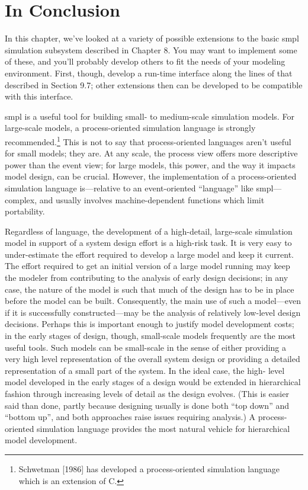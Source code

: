 \section{In Conclusion}

In this chapter, we've looked at a variety of possible extensions to the
basic smpl simulation subsystem described in Chapter 8. You may want to
implement some of these, and you'll probably develop others to fit the needs
of your modeling environment. First, though, develop a run-time interface
along the lines of that described in Section 9.7; other extensions then can be
developed to be compatible with this interface.

smpl is a useful tool for building small- to medium-scale simulation
models. For large-scale models, a process-oriented simulation language is
strongly recommended.\footnote{Schwetman [1986] has developed a process-oriented simulation language which is an extension of C.}
This is not to say that process-oriented languages
aren't useful for small models; they are. At any scale, the process view
offers more descriptive power than the event view; for large models, this
power, and the way it impacts model design, can be crucial. However, the
implementation of a process-oriented simulation language is---relative to an
event-oriented ``language'' like smpl---complex, and usually involves
machine-dependent functions which limit portability.

Regardless of language, the development of a high-detail, large-scale
simulation model in support of a system design effort is a high-risk task. It
is very easy to under-estimate the effort required to develop a large model
and keep it current. The effort required to get an initial version of a large
model running may keep the modeler from contributing to the analysis of
early design decisions; in any case, the nature of the model is such that much
of the design has to be in place before the model can be built. Consequently,
the main use of such a model---even if it is successfully constructed---may be
the analysis of relatively low-level design decisions. Perhaps this is
important enough to justify model development costs; in the early stages of
design, though, small-scale models frequently are the most useful tools. Such
models can be small-scale in the sense of either providing a very high level
representation of the overall system design or providing a detailed
representation of a small part of the system. In the ideal case, the high-
level model developed in the early stages of a design would be extended in
hierarchical fashion through increasing levels of detail as the design
evolves. (This is easier said than done, partly because designing usually is
done both ``top down'' and ``bottom up'', and both approaches raise issues
requiring analysis.) A process-oriented simulation language provides the
most natural vehicle for hierarchical model development.

